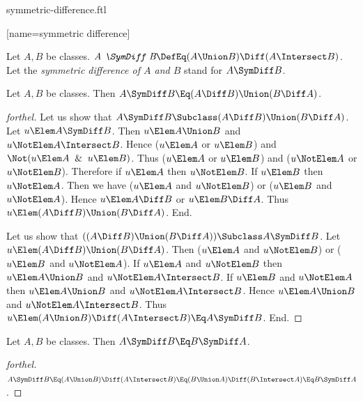 \documentclass{stex}
\begin{document}
\begin{smodule}{symmetric-difference.ftl}


[name=symmetric difference]{\,\triangle\,}

\begin{definition*}[forthel,for=symmetric difference]
  Let $A, B$ be classes.
  $\emph{A \SymDiff B} \DefEq (A \Union B) \Diff (A \Intersect B)$.
  Let the \emph{symmetric difference of $A$ and $B$} stand for $A \SymDiff B$.
\end{definition*}

\begin{proposition*}[forthel]
  Let $A, B$ be classes.
  Then $A \SymDiff B \Eq (A \Diff B) \Union (B \Diff A)$.
\end{proposition*}
\begin{proof}[forthel]
  Let us show that $A \SymDiff B \Subclass (A \Diff B) \Union (B \Diff A)$.
    Let $u \Elem A \SymDiff B$.
    Then $u \Elem A \Union B$ and $u \NotElem A \Intersect B$.
    Hence ($u \Elem A$ or $u \Elem B$) and $\Not(u \Elem A \And u \Elem B)$.
    Thus ($u \Elem A$ or $u \Elem B$) and ($u \NotElem A$ or $u \NotElem B$).
    Therefore if $u \Elem A$ then $u \NotElem B$.
    If $u \Elem B$ then $u \NotElem A$.
    Then we have ($u \Elem A$ and $u \NotElem B$) or ($u \Elem B$ and $u \NotElem A$).
    Hence $u \Elem A \Diff B$ or $u \Elem B \Diff A$.
    Thus $u \Elem (A \Diff B) \Union (B \Diff A)$.
  End.

  Let us show that $((A \Diff B) \Union (B \Diff A)) \Subclass A \SymDiff B$. %
    Let $u \Elem (A \Diff B) \Union (B \Diff A)$.
    Then ($u \Elem A$ and $u \NotElem B$) or ($u \Elem B$ and $u \NotElem A$).
    If $u \Elem A$ and $u \NotElem B$ then $u \Elem A \Union B$ and $u \NotElem A \Intersect B$.
    If $u \Elem B$ and $u \NotElem A$ then $u \Elem A \Union B$ and $u \NotElem A \Intersect B$.
    Hence $u \Elem A \Union B$ and $u \NotElem A \Intersect B$.
    Thus $u \Elem (A \Union B) \Diff (A \Intersect B) \Eq A \SymDiff B$.
  End.
\end{proof}

\begin{proposition*}[forthel]
  Let $A, B$ be classes.
  Then $A \SymDiff B \Eq B \SymDiff A$.
\end{proposition*}
\begin{proof}[forthel]
  $A \SymDiff B
    \Eq (A \Union B) \Diff (A \Intersect B)
    \Eq (B \Union A) \Diff (B \Intersect A)
    \Eq B \SymDiff A$.
\end{proof}


\end{smodule}
\end{document}
